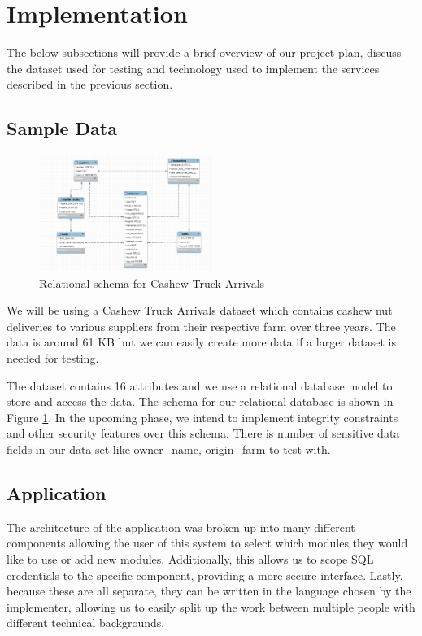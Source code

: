 \documentclass[sigconf]{acmart}
\begin{document}
\section{Implementation}
The below subsections will provide a brief overview of our project plan, discuss the dataset used for testing and technology used to implement the services described in the previous section.

\subsection{Sample Data}

\begin{figure}[ht]
	  \includegraphics[width=0.5\textwidth]{cashew_erd_updated.png}
  \caption{Relational schema for Cashew Truck Arrivals}
    \label{fig:cashew_data}
\end{figure}

We will be using a Cashew Truck Arrivals dataset which contains cashew nut deliveries to various suppliers from their respective farm over three years. The data is around 61 KB but we can easily create more data if a larger dataset is needed for testing.

The dataset contains 16 attributes and we use a relational database model to store and access the data. The schema for our relational database is shown in Figure \ref{fig:cashew_data}. In the upcoming phase, we intend to implement integrity constraints and other security features over this schema. There is number of sensitive data fields in our data set like owner\_name, origin\_farm to test with.

\subsection{Application}
 
 The architecture of the application was broken up into many different components allowing the user of this system to select which modules they would like to use or add new modules. Additionally, this allows us to scope SQL credentials to the specific component, providing a more secure interface. Lastly, because these are all separate, they can be written in the language chosen by the implementer, allowing us to easily split up the work between multiple people with different technical backgrounds. 
 
\end{document}
